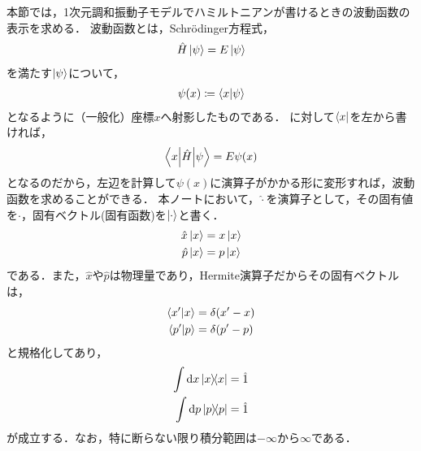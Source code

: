 \documentclass{report}
\begin{document}
  本節では，1次元調和振動子モデルでハミルトニアンが書けるときの波動函数の表示を求める．
  波動函数とは，Schr\"odinger方程式，
  \begin{align}
    \hat{H}\ket{\psi} = E\ket{\psi}\label{schrodinger-equation}
  \end{align}
  を満たす$\ket{\psi}$について，
  \begin{align}
    \psi(x) \coloneqq \braket{x}{\psi}
  \end{align}
  となるように（一般化）座標$x$へ射影したものである．
  に対して$\bra{x}$を左から書ければ，
  \begin{align}
    \mel**{x}{\hat{H}}{\psi} = E\psi(x)\label{bra-x-from-left}
  \end{align}
  となるのだから，左辺を計算して$\psi(x)$に演算子がかかる形に変形すれば，波動函数を求めることができる．
  本ノートにおいて，$\hat{\cdot}$を演算子として，その固有値を$\cdot$，固有ベクトル(固有函数)を$\ket{\cdot}$と書く．
  \begin{align}
    \hat{x}\ket{x} &= x\ket{x} \\ 
    \hat{p}\ket{x} &= p\ket{x}
  \end{align}
  である．また，$\hat{x}$や$\hat{p}$は物理量であり，Hermite演算子だからその固有ベクトルは，
  \begin{align}
    \braket{x'}{x} &= \delta\qty(x' - x) \\ 
    \braket{p'}{p} &= \delta\qty(p' - p)
  \end{align}
  と規格化してあり，
  \begin{align}
    \int\dd{x}\ketbra{x}{x} &= \hat{1} \\ 
    \int\dd{p}\ketbra{p}{p} &= \hat{1}
  \end{align}
  が成立する．なお，特に断らない限り積分範囲は$-\infty$から$\infty$である．
\end{document}
